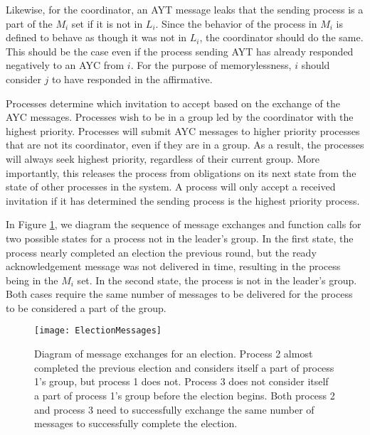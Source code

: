 Likewise, for the coordinator, an \ac{AYT} message leaks that the sending process is a part of the $M_i$ set if it is not in $L_i$.
Since the behavior of the process in $M_i$ is defined to behave as though it was not in $L_i$, the coordinator should do the same.
This should be the case even if the process sending \ac{AYT} has already responded negatively to an \ac{AYC} from $i$.
For the purpose of memorylessness, $i$ should consider $j$ to have responded in the affirmative.

Processes determine which invitation to accept based on the exchange of the \ac{AYC} messages.
Processes wish to be in a group led by the coordinator with the highest priority.
Processes will submit AYC messages to higher priority processes that are not its coordinator, even if they are in a group.
As a result, the processes will always seek highest priority, regardless of their current group.
More importantly, this releases the process from obligations on its next state from the state of other processes in the system.
A process will only accept a received invitation if it has determined the sending process is the highest priority process.


In Figure \ref{fig:electionmessages}, we diagram the sequence of message exchanges and function calls for two possible states for a process not in the leader's group.
In the first state, the process nearly completed an election the previous round, but the ready acknowledgement message was not delivered in time, resulting in the process being in the $M_i$ set.
In the second state, the process is not in the leader's group.
Both cases require the same number of messages to be delivered for the process to be considered a part of the group.

\begin{figure}[t]
\centering
\texttt{[image: ElectionMessages]}
\caption[Diagram of message exchanges for an election.]{Diagram of message exchanges for an election. Process 2 almost completed the previous election and considers itself a part of process 1's group, but process 1 does not. Process 3 does not consider itself a part of process 1's group before the election begins. Both process 2 and process 3 need to successfully exchange the same number of messages to successfully complete the election.}
\label{fig:electionmessages}
\end{figure}

